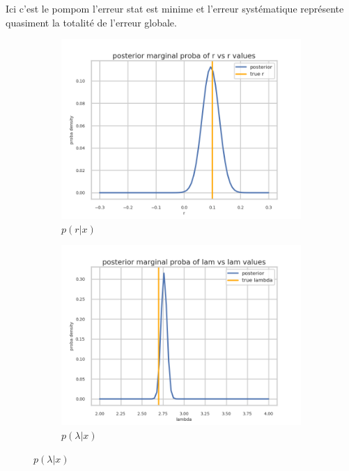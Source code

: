 Ici c'est le pompom l'erreur stat est minime et l'erreur systématique représente quasiment la totalité de l'erreur globale.


\begin{figure}[htb]
  \centering
  \begin{subfigure}[t]{0.49\linewidth}
    \includegraphics[width=\linewidth]{s3d2/marginal_r.png}
    \caption{$p(r|x)$}
    \label{fig:marginal_r}
  \end{subfigure}%
  \hfill
  \begin{subfigure}[t]{0.49\linewidth}
    \includegraphics[width=\linewidth]{s3d2/marginal_lam.png}
    \caption{$p(\lambda|x)$}
    \label{fig:marginal_lambda}
  \end{subfigure}


\end{figure}
